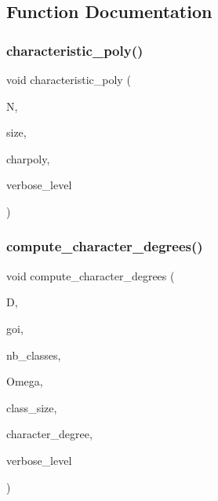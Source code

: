 \subsection{Function Documentation}
\mbox{\label{burnside_8_c_a5629a5d628bae5cbf28c0de6386de1d5}} 
\subsubsection{\texorpdfstring{characteristic\+\_\+poly()}{characteristic\_poly()}}
{\footnotesize\ttfamily void characteristic\+\_\+poly (\begin{DoxyParamCaption}\item[{\mbox{\hyperlink{galois_8h_a09fddde158a3a20bd2dcadb609de11dc}{I\+NT}} $\ast$}]{N,  }\item[{\mbox{\hyperlink{galois_8h_a09fddde158a3a20bd2dcadb609de11dc}{I\+NT}}}]{size,  }\item[{\mbox{\hyperlink{classunipoly}{unipoly}} \&}]{charpoly,  }\item[{\mbox{\hyperlink{galois_8h_a09fddde158a3a20bd2dcadb609de11dc}{I\+NT}}}]{verbose\+\_\+level }\end{DoxyParamCaption})}

\mbox{\label{burnside_8_c_a13db48197db6cc79b6baaa46411c3f6e}} 
\subsubsection{\texorpdfstring{compute\+\_\+character\+\_\+degrees()}{compute\_character\_degrees()}}
{\footnotesize\ttfamily void compute\+\_\+character\+\_\+degrees (\begin{DoxyParamCaption}\item[{\mbox{\hyperlink{classa__domain}{a\+\_\+domain}} $\ast$}]{D,  }\item[{\mbox{\hyperlink{galois_8h_a09fddde158a3a20bd2dcadb609de11dc}{I\+NT}}}]{goi,  }\item[{\mbox{\hyperlink{galois_8h_a09fddde158a3a20bd2dcadb609de11dc}{I\+NT}}}]{nb\+\_\+classes,  }\item[{\mbox{\hyperlink{galois_8h_a09fddde158a3a20bd2dcadb609de11dc}{I\+NT}} $\ast$}]{Omega,  }\item[{\mbox{\hyperlink{galois_8h_a09fddde158a3a20bd2dcadb609de11dc}{I\+NT}} $\ast$}]{class\+\_\+size,  }\item[{\mbox{\hyperlink{galois_8h_a09fddde158a3a20bd2dcadb609de11dc}{I\+NT}} $\ast$\&}]{character\+\_\+degree,  }\item[{\mbox{\hyperlink{galois_8h_a09fddde158a3a20bd2dcadb609de11dc}{I\+NT}}}]{verbose\+\_\+level }\end{DoxyParamCaption})}


